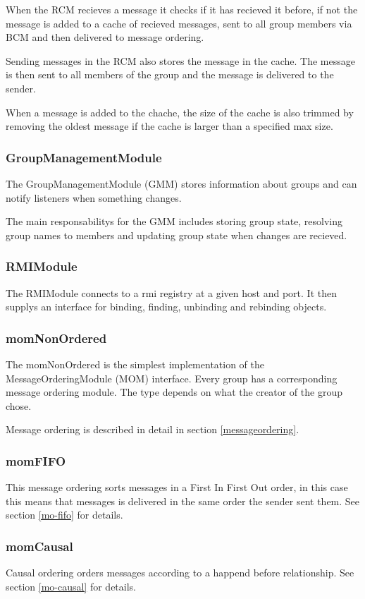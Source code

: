 \documentclass[english]{article}
\begin{document}
When the RCM recieves a message it checks if it has recieved it before, if not the message is added to a cache of recieved messages, sent to all group members via BCM and then delivered to message ordering.

Sending messages in the RCM also stores the message in the cache. The message is then sent to all members of the group and the message is delivered to the sender.

When a message is added to the chache, the size of the cache is also trimmed by removing the oldest message if the cache is larger than a specified max size.

\subsubsection{GroupManagementModule}
The GroupManagementModule (GMM) stores information about groups and can notify listeners when something changes.

The main responsabilitys for the GMM includes storing group state, resolving group names to members and updating group state when changes are recieved.

\subsubsection{RMIModule}
The RMIModule connects to a rmi registry at a given host and port. It then supplys an interface for binding, finding, unbinding and rebinding objects.

\subsubsection{momNonOrdered}
The momNonOrdered is the simplest implementation of the MessageOrderingModule (MOM) interface. Every group has a corresponding message ordering module. The type depends on what the creator of the group chose. 

Message ordering is described in detail in section \vref{messageordering}.

\subsubsection{momFIFO}
This message ordering sorts messages in a First In First Out order, in this case this means that messages is delivered in the same order the sender sent them. See section \vref{mo-fifo} for details.

\subsubsection{momCausal}
Causal ordering orders messages according to a happend before relationship. See section \vref{mo-causal} for details.
\end{document}

